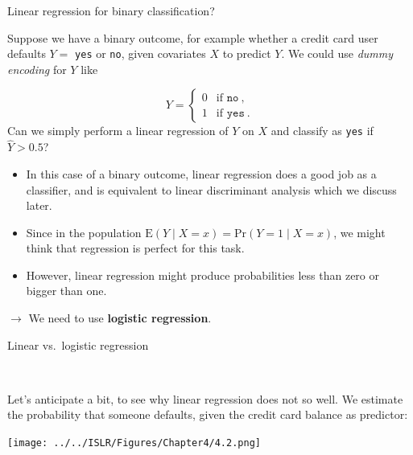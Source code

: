 \documentclass[10pt,ignorenonframetext,]{beamer}
\begin{document}
\begin{frame}[fragile]

\begin{block}{Linear regression for binary classification?}

Suppose we have a binary outcome, for example whether a credit card user
defaults \(Y =\) \texttt{yes} or \texttt{no}, given covariates \(X\) to
predict \(Y\). We could use \emph{dummy encoding} for \(Y\) like

\[Y = \left\{ \begin{array}{ll}
0 & \text{if } \texttt{no} \ , \\
1 & \text{if } \texttt{yes} \ .
\end{array} \right.\] Can we simply perform a linear regression of \(Y\)
on \(X\) and classify as \texttt{yes} if \(\hat{Y}> 0.5\)?

\begin{itemize}
\item
  In this case of a binary outcome, linear regression does a good job as
  a classifier, and is equivalent to linear discriminant analysis which
  we discuss later.
\item
  Since in the population
  \(\text{E}(Y \mid X = x) = \text{Pr}(Y = 1 \mid X = x)\), we might
  think that regression is perfect for this task.
\item
  However, linear regression might produce probabilities less than zero
  or bigger than one.
\end{itemize}

\(\rightarrow\) We need to use \textbf{logistic regression}.

\end{block}

\end{frame}

\begin{frame}

\begin{block}{Linear vs.~logistic regression}

\(~\)

Let's anticipate a bit, to see why linear regression does not so well.
We estimate the probability that someone defaults, given the credit card
balance as predictor: \vspace{2mm}

\texttt{[image: ../../ISLR/Figures/Chapter4/4.2.png]}

\end{block}

\end{frame}
\end{document}
